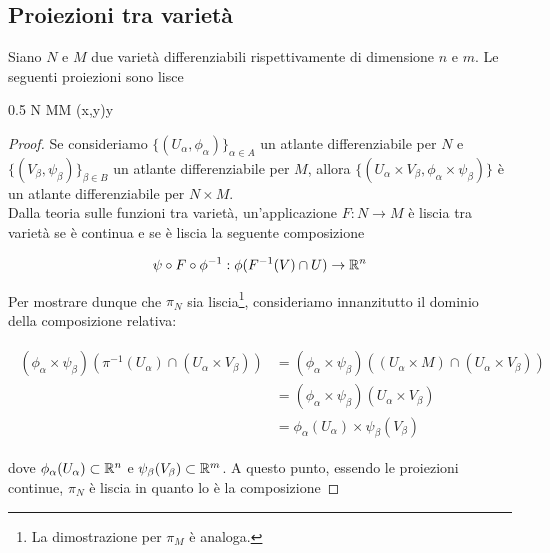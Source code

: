 \subsection{Proiezioni tra varietà}

\begin{definition}
	Siano $ N $ e $ M $ due varietà differenziabili rispettivamente di dimensione $ n $ e $ m $. Le seguenti proiezioni sono lisce
	
		{0.5}{%
					{N \times M}{M}
					{(x,y)}{y}
				}
\end{definition}

\begin{proof}
	Se consideriamo $ \{(U_{\alpha},\phi_{\alpha})\}_{\alpha \in A} $ un atlante differenziabile per $ N $ e $ \{(V_{\beta},\psi_{\beta})\}_{\beta \in B} $ un atlante differenziabile per $ M $, allora $ \{(U_{\alpha} \times V_{\beta},\phi_{\alpha} \times \psi_{\beta})\} $ è un atlante differenziabile per $ N \times M $.\\
	Dalla teoria sulle funzioni tra varietà, un'applicazione $ F : N \to M $ è liscia tra varietà se è continua e se è liscia la seguente composizione
	
	\begin{equation}
		\psi \circ F \circ \phi^{-1} : \phi(F^{-1}(V) \cap U) \to \mathbb{R}^{n}
	\end{equation}
	
	Per mostrare dunque che $ \pi_{N} $ sia liscia\footnote{%
		La dimostrazione per $ \pi_{M} $ è analoga.%
	}, consideriamo innanzitutto il dominio della composizione relativa:
	
	\begin{align}
		\begin{split}
			(\phi_{\alpha} \times \psi_{\beta})(\pi^{-1}(U_{\alpha}) \cap (U_{\alpha} \times V_{\beta})) &= (\phi_{\alpha} \times \psi_{\beta})((U_{\alpha} \times M) \cap (U_{\alpha} \times V_{\beta}))\\
			&= (\phi_{\alpha} \times \psi_{\beta})(U_{\alpha} \times V_{\beta})\\
			&= \phi_{\alpha}(U_{\alpha}) \times \psi_{\beta}(V_{\beta})
		\end{split}	
	\end{align}
	
	dove $ \phi_{\alpha}(U_{\alpha}) \subset \mathbb{R}^{n} $ e $ \psi_{\beta}(V_{\beta}) \subset \mathbb{R}^{m} $. A questo punto, essendo le proiezioni continue, $ \pi_{N} $ è liscia in quanto lo è la composizione
	

\end{proof}
